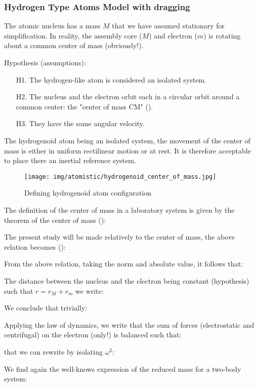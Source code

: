 	\subsubsection{Hydrogen Type Atoms Model with dragging}
	
	The atomic nucleus has a mass $M$ that we have assumed stationary for simplification. In reality, the assembly core ($M$) and electron ($m$) is rotating about a common center of mass (obviously!).
	
	Hypothesis (assumptions):
	\begin{enumerate}
		\item[H1.] The hydrogen-like atom is considered an isolated system.
	
		\item[H2.] The nucleus and the electron orbit each in a circular orbit around a common center: the "center of mass CM" ().

		\item[H3.] They have the same angular velocity.
		\end{enumerate}
	The hydrogenoid atom being an isolated system, the movement of the center of mass is either in uniform rectilinear motion or at rest. It is therefore acceptable to place there an inertial reference system.
	\begin{figure}[H]
		\centering
		\texttt{[image: img/atomistic/hydrogenoid\_center\_of\_mass.jpg]}
		\caption{Defining hydrogenoid atom configuration}
	\end{figure}
	The definition of the center of mass in a laboratory system is given by the theorem of the center of mass ():
	
The present study will be made relatively to the center of mass, the above relation becomes ():
	
From the above relation, taking the norm and absolute value, it follows that:
	
The distance between the nucleus and the electron being constant (hypothesis) such that $r=r_M+r_m$ we write:
	
We conclude that trivially:
	
	Applying the law of dynamics, we write that the sum of forces (electrostatic and centrifugal) on the electron (only!) is balanced such that:
	
that we can rewrite by isolating $\omega^2$:
	
	We find again the well-knows expression of the reduced mass for a two-body system:
	
